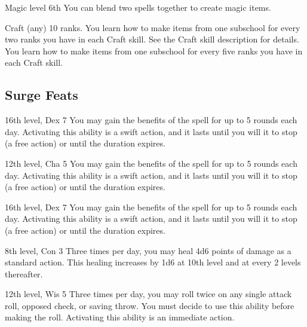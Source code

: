  Magic level 6th
 You can blend two spells together to create magic items. 

 Craft (any) 10 ranks.
 You learn how to make items from one subschool for every two ranks you have in each Craft skill. See the Craft skill description for details.
 You learn how to make items from one subschool for every five ranks you have in each Craft skill.

\subsection{Surge Feats}

\featpre 16th level, Dex 7
\featben You may gain the benefits of the  spell for up to 5 rounds each day. Activating this ability is a swift action, and it lasts until you will it to stop (a free action) or until the duration expires.

\featpre 12th level, Cha 5
\featben You may gain the benefits of the  spell for up to 5 rounds each day. Activating this ability is a swift action, and it lasts until you will it to stop (a free action) or until the duration expires.

\featpre 16th level, Dex 7
\featben You may gain the benefits of the  spell for up to 5 rounds each day. Activating this ability is a swift action, and it lasts until you will it to stop (a free action) or until the duration expires.

\featpre 8th level, Con 3
\featben Three times per day, you may heal 4d6 points of damage as a standard action. This healing increases by 1d6 at 10th level and at every 2 levels thereafter.

\featpre 12th level, Wis 5
\featben Three times per day, you may roll twice on any single attack roll, opposed check, or saving throw. You must decide to use this ability before making the roll. Activating this ability is an immediate action.

